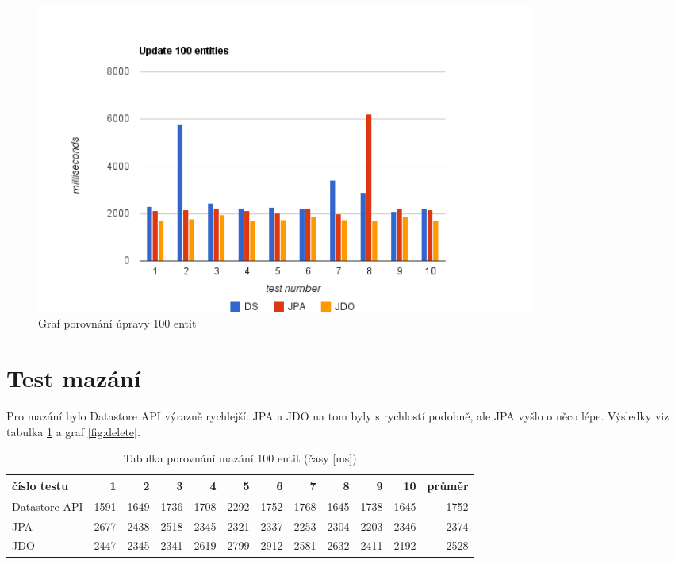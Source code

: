 \begin{figure}[h]
\begin{center}
\includegraphics[width=6.5in]{figures/update.png}
\caption{Graf porovnání úpravy 100 entit}
\label{fig:update}
\end{center}
\end{figure}


\section{Test mazání}

Pro mazání bylo Datastore API výrazně rychlejší. JPA a JDO na tom byly s rychlostí podobně, ale JPA vyšlo o něco lépe. Výsledky viz tabulka \ref{tab:delete} a graf \ref{fig:delete}.

\begin{table}[h]
\centering
\caption{Tabulka porovnání mazání 100 entit (časy [ms])}\label{tab:delete}
\begin{tabular}{|l|r|r|r|r|r|r|r|r|r|r|r|}
   \hline
číslo testu	& 1		& 2		& 3		& 4		& 5		& 6		& 7		& 8		& 9		& 10		& průměr \\
   \hline
Datastore API	& 1591	& 1649	& 1736	& 1708	& 2292	& 1752	& 1768	& 1645	& 1738	& 1645	& 1752 \\
JPA	& 2677	& 2438	& 2518	& 2345	& 2321	& 2337	& 2253	& 2304	& 2203	& 2346	& 2374 \\
JDO	& 2447	& 2345	& 2341	& 2619	& 2799	& 2912	& 2581	& 2632	& 2411	& 2192	& 2528 \\
   \hline
\end{tabular}
\end{table}

